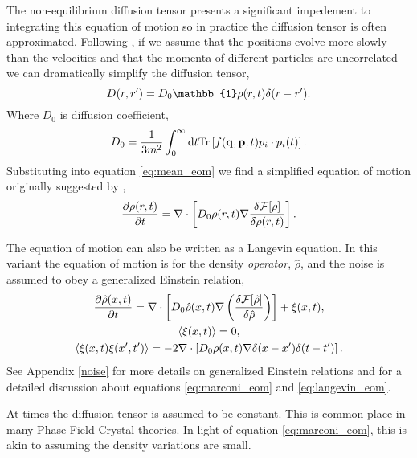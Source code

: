 The non-equilibrium diffusion tensor presents a significant impedement to
integrating this equation of motion so in practice the diffusion tensor is
often approximated. Following \cite{ESPANOL09}, if we assume that the positions
evolve more slowly than the velocities and that the momenta of different
particles are uncorrelated we can dramatically simplify the diffusion tensor,
%
\begin{equation}
    D(r, r^\prime) = D_0\mathbb{1}\rho(r, t)\d(r - r^\prime).
\end{equation}
%
Where $D_0$ is diffusion coefficient,
%
\begin{equation}
    D_0 = \frac{1}{3 m^2} \int_0^\infty \mathrm{d}t 
        \mathrm{Tr}\left[ f(\mathbf{q}, \mathbf{p}, t) p_i \cdot p_i(t) \right].
\end{equation}
%
Substituting into equation \ref{eq:mean_eom} we find a simplified equation of
motion originally suggested by \cite{MT1999},
%
\begin{equation}
    \label{eq:marconi_eom}
    \frac{\partial \rho(r, t)}{\partial t} = 
        \nabla \cdot \left[ D_0 \rho(r, t)
        \nabla \frac{\delta \mathcal{F}[\rho]}{\delta \rho(r, t)}\right].
\end{equation}
%

The equation of motion can also be written as a Langevin equation. In this
variant the equation of motion is for the density \textit{operator},
$\hat{\rho}$, and the noise is assumed to obey a generalized Einstein relation,
%
\begin{gather}
    \label{eq:langevin_eom}
    \frac{\partial \hat{\rho}(x, t)}{\partial t} =
        \nabla \cdot \left[
            D_0 \hat{\rho}(x, t) \nabla \left(
            \frac{\delta \mathcal{F}[\hat{\rho}]}{\delta \hat{\rho}}\right)
            \right] + \xi(x, t), \\
    \left\langle \xi(x, t) \right\rangle = 0, \\
    \left\langle \xi(x, t)\xi(x^\prime, t^\prime) \right\rangle = 
        -2 \nabla \cdot \left[ D_0 \rho(x,t) 
            \nabla \delta(x - x^\prime) \delta(t - t^\prime)\right].
\end{gather}
%
See Appendix \ref{noise} for more details on generalized Einstein relations and
\cite{AR2004} for a detailed discussion about equations \ref{eq:marconi_eom}
and \ref{eq:langevin_eom}.

At times the diffusion tensor is assumed to be constant. This is common place
in many Phase Field Crystal theories. In light of equation
\ref{eq:marconi_eom}, this is akin to assuming the density variations are
small.

